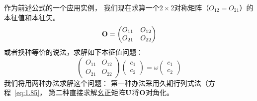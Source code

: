 作为前述公式的一个应用实例，
我们现在求算一个$2\times 2$对称矩阵（$O_{12}=O_{21}$）的本征值和本征矢。
\[\mathbf{O} = \begin{pmatrix}
 O_{11} & O_{12} \\ O_{21} & O_{22}
\end{pmatrix}\]
或者换种等价的说法，求解如下本征值问题：
\begin{equation}
 \begin{pmatrix}
     O_{11} & O_{12} \\ O_{21} &O_{22}
 \end{pmatrix} \begin{pmatrix}
     c_1 \\ c_2
 \end{pmatrix} = \omega \begin{pmatrix}
     c_1 \\ c_2
 \end{pmatrix}
 \label{eq:1.94}
\end{equation}
我们将用两种办法求解这个问题：
第一种办法采用久期行列式法（方程~\ref{eq:1.85}，
第二种直接求解幺正矩阵$\mathbf U$将$\mathbf O$对角化。

